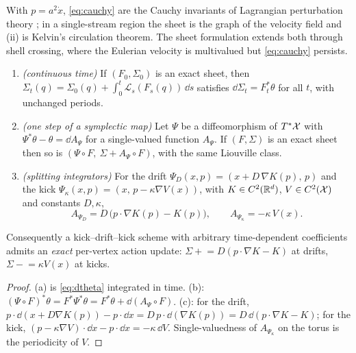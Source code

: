 \begin{remark}\label{rem:cauchy}
With $p=a^2\dot x$, \eqref{eq:cauchy} are the Cauchy invariants of Lagrangian perturbation theory
\cite{FrischVillone2014,ZheligovskyFrisch2014,RampfVilloneFrisch2015}; in a single-stream region the sheet is the
graph of the velocity field and (ii) is Kelvin's circulation theorem. The sheet formulation extends both through
shell crossing, where the Eulerian velocity is multivalued but \eqref{eq:cauchy} persists.
\end{remark}

\begin{theorem}\label{thm:action}
\begin{enumerate}[label=(\alph*),leftmargin=2.2em,itemsep=1pt]
\item \emph{(continuous time)} If $(F_0,\Sigma_0)$ is an exact sheet, then
$\Sigma_t(q)=\Sigma_0(q)+\int_0^t\mathcal{L}_s(F_s(q))\,\dd s$ satisfies $\dd\Sigma_t=F_t^*\theta$ for all $t$, with unchanged periods.
\item \emph{(one step of a symplectic map)} Let $\Psi$ be a diffeomorphism of $T^*\mathcal{X}$ with
$\Psi^*\theta-\theta=\dd A_\Psi$ for a single-valued function $A_\Psi$. If $(F,\Sigma)$ is an exact sheet then so is
$(\Psi\circ F,\ \Sigma+A_\Psi\circ F)$, with the same Liouville class.
\item \emph{(splitting integrators)} For the drift $\Psi_D(x,p)=(x+D\,\nabla K(p),\,p)$ and the kick
$\Psi_\kappa(x,p)=(x,\,p-\kappa\nabla V(x))$, with $K\in C^2(\mathbb{R}^d)$, $V\in C^2(\mathcal{X})$ and constants $D,\kappa$,
\begin{equation}\label{eq:genfun}
A_{\Psi_D}=D\,\big(p\cdot\nabla K(p)-K(p)\big),\qquad A_{\Psi_\kappa}=-\kappa\,V(x).
\end{equation}
\end{enumerate}
Consequently a kick--drift--kick scheme with arbitrary time-dependent coefficients admits an \emph{exact}
per-vertex action update: $\Sigma\mathrel{+}=D(p\cdot\nabla K-K)$ at drifts, $\Sigma\mathrel{-}=\kappa V(x)$ at kicks.
\end{theorem}
\begin{proof}
(a) is \eqref{eq:dtheta} integrated in time. (b): $(\Psi\circ F)^*\theta=F^*\Psi^*\theta=F^*\theta+\dd(A_\Psi\circ F)$.
(c): for the drift, $p\cdot\dd(x+D\nabla K(p))-p\cdot\dd x=D\,p\cdot\dd(\nabla K(p))=D\,\dd(p\cdot\nabla K-K)$; for the
kick, $(p-\kappa\nabla V)\cdot\dd x-p\cdot\dd x=-\kappa\,\dd V$. Single-valuedness of $A_{\Psi_\kappa}$ on the torus
is the periodicity of $V$.
\end{proof}

